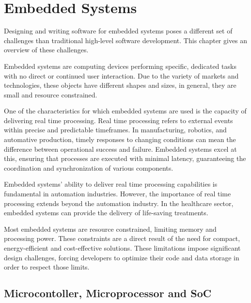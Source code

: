 

\chapter{Embedded Systems}

Designing and writing software for embedded systems poses a different set of
challenges than traditional high-level software development.
This chapter gives an overview of these challenges.

Embedded systems are computing devices performing specific, dedicated tasks
with no direct or continued user interaction. \cite{embedded_systems_architecture}
Due to the variety of markets and technologies, these objects have different
shapes and sizes, in general, they are small and resource constrained.

One of the characteristics for which embedded systems are used is the capacity
of delivering real time processing.
Real time processing refers to external events within precise and predictable
timeframes. In manufacturing, robotics, and automative production, timely
responses to changing conditions can mean the difference between operational
success and failure. Embedded systems excel at this, ensuring that processes
are executed with minimal latency, guaranteeing the coordination and
synchronization of various components.

Embedded systems' ability to deliver real time processing capabilities is
fundamental in automation industries. 
However, the importance of real time processing extends beyond the automation
industry. In the healthcare sector, embedded systems can provide the delivery
of life-saving treatments.

Most embedded systems are resource constrained, limiting memory and processing
power.
These constraints are a direct result of the need for compact, energy-efficient
and cost-effective solutions.
These limitations impose significant design challenges, forcing developers to
optimize their code and data storage in order to respect those limits.

\section{Microcontoller, Microprocessor and SoC}

